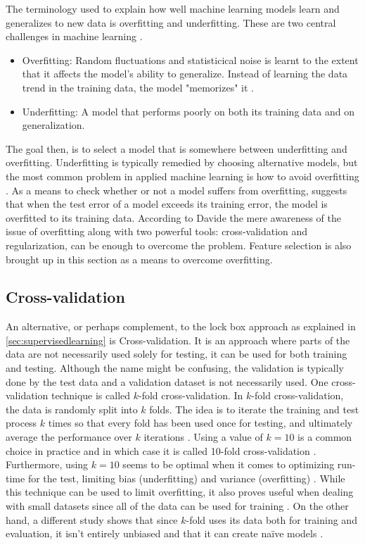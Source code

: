 	The terminology used to explain how well machine learning models learn and generalizes to new data is overfitting and underfitting. These are two central challenges in machine learning \cite{BOOK:1}. 
\begin{itemize}
	\item{Overfitting:} Random fluctuations and statisticical noise is learnt to the extent that it affects the model's ability to generalize. Instead of learning the data trend in the training data, the model "memorizes" it \cite{ARTICLE:4}.  
	\item{Underfitting:} A model that performs poorly on both its training data and on generalization. 
\end{itemize}
The goal then, is to select a model that is somewhere between underfitting and overfitting. Underfitting is typically remedied by choosing alternative models, but the most common problem in applied machine learning is how to avoid overfitting \cite{WEBSITE:8}. As a means to check whether or not a model suffers from overfitting, \cite{IP:7} suggests that when the test error of a model exceeds its training error, the model is overfitted to its training data. %
According to Davide \cite{ARTICLE:4}  the mere awareness of the issue of overfitting along with two powerful tools: cross-validation and regularization, can be enough to overcome the problem. Feature selection is also brought up in this section as a means to overcome overfitting.

	\subsection{Cross-validation} \label{sec:crossval}
	 An alternative, or perhaps complement, to the lock box approach as explained in \ref{sec:supervisedlearning} is Cross-validation. It is an approach where parts of the data are not necessarily used solely for testing, it can be used for both training and testing. Although the name might be confusing, the validation is typically done by the test data and a validation dataset is not necessarily used. One cross-validation technique is called $k$-fold cross-validation. In $k$-fold cross-validation, the data is randomly split into $k$ folds. The idea is to iterate the training and test process $k$ times so that every fold has been used once for testing, and ultimately average the performance over $k$ iterations . Using a value of $k = 10$ is a common choice in practice and in which case it is called 10-fold cross-validation \cite{ARTICLE:4}. Furthermore, using $k=10$ seems to be optimal when it comes to optimizing run-time for the test, limiting bias (underfitting) and variance (overfitting) \cite{BOOK:4}. While this technique can be used to limit overfitting, it also proves useful when dealing with small datasets since all of the data can be used for training \cite{ARTICLE:4}.  On the other hand, a different study shows that since $k$-fold uses its data both for training and evaluation, it isn't entirely unbiased and that it can create naïve models \cite{ARTICLE:25}. %


